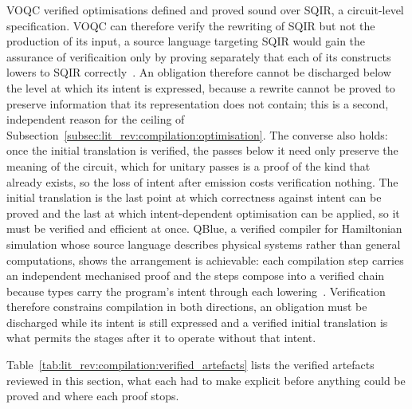 VOQC verified optimisations defined and proved sound over SQIR, a circuit-level specification.
VOQC can therefore verify the rewriting of SQIR but not the production of its input, a source language targeting SQIR would gain the assurance of verificaition only by proving separately that each of its constructs lowers to SQIR correctly~\cite{hietala2023voqc}.
An obligation therefore cannot be discharged below the level at which its intent is expressed, because a rewrite cannot be proved to preserve information that its representation does not contain; this is a second, independent reason for the ceiling of Subsection~\ref{subsec:lit_rev:compilation:optimisation}.
The converse also holds: once the initial translation is verified, the passes below it need only preserve the meaning of the circuit, which for unitary passes is a proof of the kind that already exists, so the loss of intent after emission costs verification nothing.
The initial translation is the last point at which correctness against intent can be proved and the last at which intent-dependent optimisation can be applied, so it must be verified and efficient at once.
QBlue, a verified compiler for Hamiltonian simulation whose source language describes physical systems rather than general computations, shows the arrangement is achievable: each compilation step carries an independent mechanised proof and the steps compose into a verified chain because types carry the program's intent through each lowering~\cite{verifiedcompiler2025qblue}.
Verification therefore constrains compilation in both directions, an obligation must be discharged while its intent is still expressed and a verified initial translation is what permits the stages after it to operate without that intent.

Table~\ref{tab:lit_rev:compilation:verified_artefacts} lists the verified artefacts reviewed in this section, what each had to make explicit before anything could be proved and where each proof stops.

